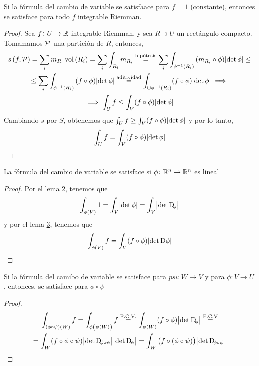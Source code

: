 \begin{lema*}[3]\label{lema:tres_cambio}
    Si la fórmula del cambio de variable se satisfaace para $f = 1$ (constante), entonces se satisface para todo $f$ integrable Riemman.
\end{lema*}

\begin{proof}
    Sea $f \colon U \to \mathbb{R}$ integrable Riemman, y sea $R \supset U$ un rectángulo compacto. Tomamamos $\mathcal{P}$ una partición de $R$, entonces,
    \begin{gather*}
        s\left( f, \mathcal{P} \right) = \sum_i m_{R_i} \operatorname{vol}\left( R_i \right) = \sum_{i} \int_{R_i} m_{R_i} \stackrel{\text{hipótesis}}{=}
        \sum_i \int_{\phi^{-1}\left( R_i \right)} \left( m_{R_i} \circ \phi \right)\abs{\det\phi} \leq \\ \leq
        \sum_i \int_{\phi^{-1}\left( R_i \right)} \left( f \circ \phi \right) \abs{\det\phi} \stackrel{\text{aditividad}}{=}
        \int_{\cup \phi^{-1}\left( R_i \right)} (f \circ \phi) \abs{\det \phi} \implies \\ \implies
        \int_U f \leq \int_V (f \circ \phi) \abs{\det \phi}
    \end{gather*}
    Cambiando $s$ por $S$, obtenemos que $\int_U f \geq \int_V (f \circ \phi) \abs{\det\phi}$ y por lo tanto,
    \[
        \int_U f = \int_V (f \circ \phi) \abs{\det \phi} 
    \]
\end{proof}

\begin{lema*}[4]\label{lema:cuatro_cambio}
    La fórmula del cambio de variable se satisface si $\phi \colon \mathbb{R}^n \to \mathbb{R}^n$ es lineal
\end{lema*}
\begin{proof}
    Por el lema \hyperref[lema:dos_cambio]{2}, tenemos que
    \[
        \int_{\phi(V)} 1 = \int_V \abs{\det \phi} = \int_V \abs{\det \Dif_\phi}
    \]
    y por el lema \hyperref[lema:tres_cambio]{3}, tenemos que
    \[
        \int_{\phi(V)} f = \int_V (f \circ \phi) \abs{\det \Dif \phi}
    \]
\end{proof}

\begin{lema*}[5]\label{lema:cinco_cambio}
    Si la fórmula del camibo de variable se satisface para $psi \colon W \to V$ y para $\phi \colon V \to U$, entonces, se satisface para
    $\phi \circ \psi$
\end{lema*}

\begin{proof}
    \begin{gather*}
        \int_{(\phi \circ \psi)(W)} f = \int_{\phi\left( \psi(W) \right)} f \stackrel{\text{F.C.V.}}{=} \int_{\psi(W)} (f \circ \phi)
        \abs{\det \Dif_\phi} \stackrel{\text{F.C.V}}{=} \\ = \int_W (f \circ \phi \circ \psi) \abs{\det \Dif_{\phi \circ \psi}} \abs{\det \Dif_\psi} =
        \int_W \left( f \circ ( \phi \circ \psi) \right) \abs{\det \Dif_{\phi \circ \psi}}
    \end{gather*}
\end{proof}

